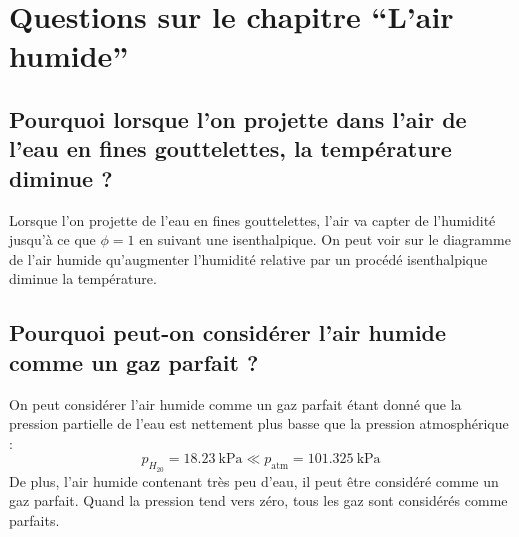 \section{Questions sur le chapitre ``L'air humide''}
\subsection{Pourquoi lorsque l'on projette dans l'air de l'eau en fines gouttelettes, la température diminue ?}
Lorsque l'on projette de l'eau en fines gouttelettes, l'air va capter de l'humidité jusqu'à ce que $\phi=1$ en suivant une isenthalpique. On peut voir sur le diagramme de l'air humide qu'augmenter l'humidité relative par un procédé isenthalpique diminue la température. 

\subsection{Pourquoi peut-on considérer l'air humide comme un gaz parfait ?}
On peut considérer l'air humide comme un gaz parfait étant donné que la pression partielle de l'eau est nettement plus basse que la pression atmosphérique :
\begin{equation} p_{H_20} = \SI{18.23}{\kilo\pascal} \ll p_\text{atm} = \SI{101.325}{\kilo\pascal} \end{equation}
De plus, l'air humide contenant très peu d'eau, il peut être considéré comme un gaz parfait. Quand la pression tend vers zéro, tous les gaz sont considérés comme parfaits. 

